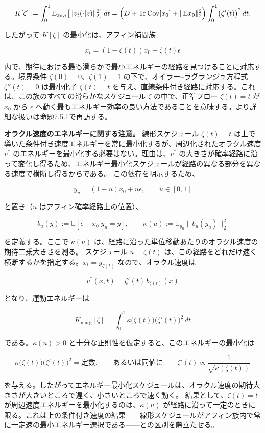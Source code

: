 \[
K[\zeta]:=\int_0^1\mathbb{E}_{x_0,\epsilon}\bigl[\|v_t(\cdot|z)\|_2^2\bigr]\,dt
=\Bigl(D+\mathrm{Tr}\,\mathrm{Cov}[x_0]+\|\mathbb{E}x_0\|_2^2\Bigr)\int_0^1\bigl(\zeta'(t)\bigr)^2\,dt.
\]


したがって $K[\zeta]$ の最小化は、アフィン補間族

\[
x_t=(1-\zeta(t))x_0+\zeta(t)\epsilon
\]


内で、期待における最も滑らかで最小エネルギーの経路を見つけることに対応する。境界条件 $\zeta(0)=0$、$\zeta(1)=1$ の下で、オイラー–ラグランジュ方程式 $\zeta''(t)=0$ は最小化子 $\zeta(t)=t$ を与え、直線条件付き経路に対応する。これは、この族のすべての滑らかなスケジュール $\zeta$ の中で、正準フロー $\zeta(t)=t$ が $x_0$ から $\epsilon$ へ動く最もエネルギー効率の良い方法であることを意味する。より詳細な扱いは命題7.5.1で再訪する。

\textbf{オラクル速度のエネルギーに関する注意。} 線形スケジュール $\zeta(t)=t$ は上で導いた条件付き速度エネルギーを常に最小化するが、周辺化されたオラクル速度 $v^*$ のエネルギーを最小化する必要はない。理由は、$v^*$ の大きさが確率経路に沿って変化し得るため、エネルギー最小化スケジュールが経路の異なる部分を異なる速度で横断し得るからである。
この依存を明示するため、

\[
y_u=(1-u)x_0+u\epsilon,\qquad u\in[0,1]
\]


と置き（$u$ はアフィン確率経路上の位置）、

\[
b_u(y):=\mathbb{E}[\epsilon-x_0|y_u=y],\qquad
\kappa(u):=\mathbb{E}_{y_u}\|b_u(y_u)\|_2^2
\]


を定義する。ここで $\kappa(u)$ は、経路に沿った単位移動あたりのオラクル速度の期待二乗大きさを測る。
スケジュール $u=\zeta(t)$ は、この経路をどれだけ速く横断するかを指定する。$x_t=y_{\zeta(t)}$ なので、オラクル速度は

\[
v^*(x,t)=\zeta'(t)\,b_{\zeta(t)}(x)
\]


となり、運動エネルギーは

\[
K_{\mathrm{marg}}[\zeta]=\int_0^1\kappa\bigl(\zeta(t)\bigr)\bigl(\zeta'(t)\bigr)^2\,dt
\]


である。$\kappa(u)>0$ と十分な正則性を仮定すると、このエネルギーの最小化は

\[
\kappa\bigl(\zeta(t)\bigr)\bigl(\zeta'(t)\bigr)^2=\text{定数},\qquad\text{あるいは同値に}\qquad
\zeta'(t)\propto\frac{1}{\sqrt{\kappa(\zeta(t))}}
\]


を与える。したがってエネルギー最小化スケジュールは、オラクル速度の期待大きさが大きいところで遅く、小さいところで速く動く。
結果として、$\zeta(t)=t$ が周辺速度エネルギーを最小化するのは、$\kappa(u)$ が経路に沿って一定のときに限る。これは上の条件付き速度の結果——線形スケジュールがアフィン族内で常に一定速の最小エネルギー選択である——との区別を際立たせる。

